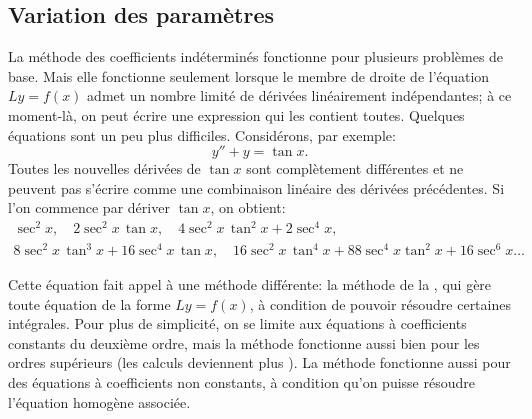 \subsection{Variation des paramètres}

La méthode des coefficients indéterminés fonctionne pour plusieurs problèmes de base. Mais elle fonctionne seulement lorsque le membre de droite de l'équation  $Ly = f(x)$ 
admet un nombre limité de dérivées linéairement indépendantes; à ce moment-là, on peut écrire une expression qui les contient toutes. Quelques équations sont un peu plus difficiles. Considérons, par exemple: 
\begin{equation*}
	y''+y = \tan x .
\end{equation*}
Toutes les nouvelles dérivées de $\tan x$ sont complètement différentes et ne peuvent pas s'écrire comme une combinaison linéaire des dérivées précédentes. Si l'on commence par dériver  $\tan x$, on obtient:
\begin{multline*}
 	  \sec^2 x, \quad
	2 \sec^2 x \, \tan x, \quad
	4 \sec^2 x \, \tan^2 x + 2 \sec^4 x, \\
	8 \sec^2 x \, \tan^3 x + 16 \sec^4 x \, \tan x, \quad
	16\sec^2 x \, \tan^4 x + 88 \sec^4 x \tan^2 x + 16 \sec^6 x \ldots
\end{multline*}

Cette équation fait appel à une méthode différente: la méthode de la
\emph{}, qui gère toute équation de
la forme $Ly = f(x)$, à condition de pouvoir résoudre certaines intégrales.  
Pour plus de simplicité, on se limite  aux équations à coefficients constants du deuxième ordre,
mais la méthode fonctionne aussi bien pour les ordres supérieurs (les calculs deviennent plus
). %
La méthode fonctionne aussi pour des équations à coefficients non constants, 
à condition qu'on puisse résoudre l'équation homogène associée.  

